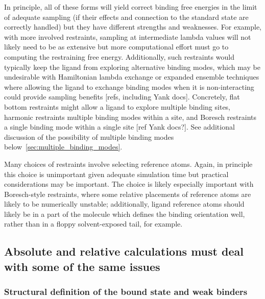 \documentclass[9pt,bestpractices]{livecoms}
\begin{document}
In principle, all of these forms will yield correct binding free energies in the limit of adequate sampling (if their effects and connection to the standard state are correctly handled) but they have different strengths and weaknesses.
For example, with more involved restraints, sampling at intermediate lambda values will not likely need to be as extensive but more computational effort must go to computing the restraining free energy.
Additionally, such restraints would typically keep the ligand from exploring alternative binding modes, which may be undesirable with Hamiltonian lambda exchange or expanded ensemble techniques where allowing the ligand to exchange binding modes when it is non-interacting could provide sampling benefits [refs, including Yank docs].
Concretely, flat bottom restraints might allow a ligand to explore multiple binding sites, harmonic restraints multiple binding modes within a site, and Boresch restraints a single binding mode within a single site [ref Yank docs?].
See additional discussion of the possibility of multiple binding modes below~\ref{sec:multiple_binding_modes}.

Many choices of restraints involve selecting reference atoms.
Again, in principle this choice is unimportant given adequate simulation time but practical considerations may be important.
The choice is likely especially important with Boresch-style restraints, where some relative placements of reference atoms are likely to be numerically unstable; additionally, ligand reference atoms should likely be in a part of the molecule which defines the binding orientation well, rather than in a floppy solvent-exposed tail, for example.



\subsection*{Absolute and relative calculations must deal with some of the same issues}

\subsubsection*{Structural definition of the bound state and weak binders}
\end{document}
